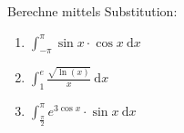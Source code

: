 \documentclass[11pt, a4paper]{article}
\newcommand\braces[1]{\left(#1\right)}
\newcommand\brackets[1]{\left[#1\right]}
\newcommand{\intend}[1][]{\ \mathrm{d}#1}
\newif\ifshowsolution
\begin{document}
Berechne mittels Substitution:
\begin{enumerate}
	\item $\int_{-\pi}^\pi \sin{x} \cdot \cos{x} \intend{x}$
	
	\ifshowsolution
		\begin{align*}
			\shortintertext{Substituiere: $\sin{x} = t$}
			\shortintertext{$\frac{dt}{dx} = \cos{x} \Leftrightarrow \intend{x} = \frac{\intend{t}}{\cos{x}}$}
			\int_{-\pi}^\pi \sin{x} \cdot \cos{x} \intend{x} &= \int_{\sin{-\pi}}^{\sin{\pi}} t\ \cancel{\cos{x}}\ \frac{\intend{t}}{\cancel{\cos{x}}} \\
			&= \int_{\sin{-\pi}}^{\sin{\pi}} t \intend{t} \\
			&= \brackets{\frac{1}{2} t^2}_{\sin{-\pi}}^{\sin{\pi}} \\
			&= \frac{1}{2} \brackets{t^2}_0^0 \\
			&= \frac{1}{2} \braces{0^2 - 0^2} \\
			&= 0
		\end{align*}
	\fi
	
	\item $\int_1^e \frac{\sqrt{\ln(x)}}{x} \intend{x}$
	
	\ifshowsolution
		\begin{align*}
			\shortintertext{Substituiere: $\ln(x) = t$}
			\shortintertext{$\frac{\intend{t}}{\intend{x}} = \frac{1}{x} \Leftrightarrow \intend{x} = x \intend{t}$}
			\int_1^e \frac{\sqrt{\ln(x)}}{x} dx &= \int_{\ln(1)}^{\ln(e)} \sqrt{z} \intend{t} \\
			&= \int_0^1 \sqrt{z} \intend{t} \\
			&= \brackets{ \frac{2}{3} z^{\frac{3}{2}} }_0^1 \\
			&= \frac{2}{3} - 0
			\shortintertext{Oder: Rücksubstitution nach Integration}
			\brackets{ \frac{2}{3} z^{\frac{3}{2}} }_0^1 &= \brackets{ \frac{2}{3} \ln(x)^{\frac{3}{2}} }_1^e \\
			&= \frac{2}{3} - 0
		\end{align*}
	\fi
	
	\item $\int_\frac{\pi}{2}^\pi e^{3 \cos x} \cdot \sin x \intend{x}$
	

\end{enumerate}
\end{document}
